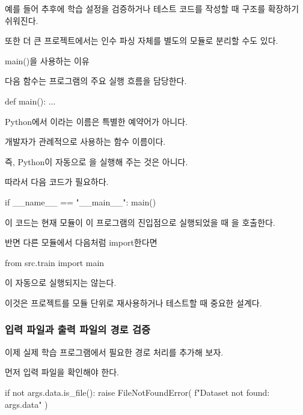 예를 들어 추후에 학습 설정을 검증하거나 테스트 코드를 작성할 때 구조를 확장하기 쉬워진다.

또한 더 큰 프로젝트에서는 인수 파싱 자체를 별도의 모듈로 분리할 수도 있다.

\begin{dhknote}
\begin{dhksmry}[centered]
main()을 사용하는 이유
\end{dhksmry}
\end{dhknote}

다음 함수는 프로그램의 주요 실행 흐름을 담당한다.

\begin{dhkcode}
def main():
    ...
\end{dhkcode}

Python에서 이라는 이름은 특별한 예약어가 아니다.

개발자가 관례적으로 사용하는 함수 이름이다.

즉, Python이 자동으로 을 실행해 주는 것은 아니다.

따라서 다음 코드가 필요하다.

\begin{dhkcode}
if __name__ == "__main__":
    main()
\end{dhkcode}

이 코드는 현재 모듈이 이 프로그램의 진입점으로 실행되었을 때 을 호출한다.

반면 다른 모듈에서 다음처럼 import한다면

\begin{dhkcode}
from src.train import main
\end{dhkcode}

이 자동으로 실행되지는 않는다.

이것은 프로젝트를 모듈 단위로 재사용하거나 테스트할 때 중요한 설계다.

\subsubsection{입력 파일과 출력 파일의 경로 검증}

이제 실제 학습 프로그램에서 필요한 경로 처리를 추가해 보자.

먼저 입력 파일을 확인해야 한다.

\begin{dhkcode}
if not args.data.is_file():
    raise FileNotFoundError(
        f"Dataset not found: {args.data}"
    )
\end{dhkcode}

